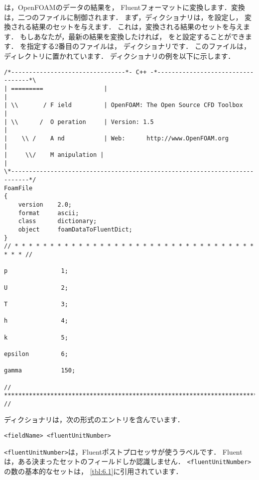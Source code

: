 は，OpenFOAMのデータの結果を，
Fluentフォーマットに変換します．変換は，二つのファイルに制御されます．
まず，ディクショナリは，を設定し，
変換される結果のセットを与えます．
これは，変換される結果のセットを与えます．
もしあなたが，最新の結果を変換したければ，
をと設定することができます．
を指定する2番目のファイルは，
ディクショナリです．
このファイルは，ディレクトリに置かれています．
ディクショナリの例を以下に示します．
\begin{OFfile}
\begin{verbatim}
/*--------------------------------*- C++ -*----------------------------------*\
| =========                 |                                                 |
| \\       / F ield         | OpenFOAM: The Open Source CFD Toolbox           |
| \\      /  O peration     | Version: 1.5                                    |
|    \\ /    A nd           | Web:      http://www.OpenFOAM.org               |
|     \\/    M anipulation |                                                  |
\*---------------------------------------------------------------------------*/
FoamFile
{
    version    2.0;
    format     ascii;
    class      dictionary;
    object     foamDataToFluentDict;
}
// * * * * * * * * * * * * * * * * * * * * * * * * * * * * * * * * * * * * * //

p               1;

U               2;

T               3;

h               4;

k               5;

epsilon         6;

gamma           150;

// ************************************************************************* //
\end{verbatim}
\end{OFfile}
ディクショナリは，次の形式のエントリを含んでいます．
\begin{OFfile}
\begin{verbatim}
<fieldName> <fluentUnitNumber>
\end{verbatim}
\end{OFfile}
\verb|<fluentUnitNumber>|は，Fluentポストプロセッサが使うラベルです．
Fluentは，ある決まったセットのフィールドしか認識しません．
\verb|<fluentUnitNumber>|の数の基本的なセットは，
\autoref{tbl:6.1}に引用されています．



